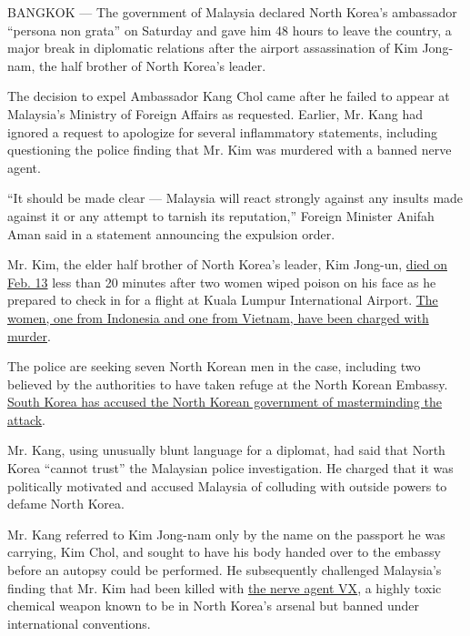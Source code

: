 BANGKOK --- The government of Malaysia declared North Korea's ambassador
``persona non grata'' on Saturday and gave him 48 hours to leave the
country, a major break in diplomatic relations after the airport
assassination of Kim Jong-nam, the half brother of North Korea's leader.

The decision to expel Ambassador Kang Chol came after he failed to
appear at Malaysia's Ministry of Foreign Affairs as requested. Earlier,
Mr. Kang had ignored a request to apologize for several inflammatory
statements, including questioning the police finding that Mr. Kim was
murdered with a banned nerve agent.

``It should be made clear --- Malaysia will react strongly against any
insults made against it or any attempt to tarnish its reputation,''
Foreign Minister Anifah Aman said in a statement announcing the
expulsion order.

Mr. Kim, the elder half brother of North Korea's leader, Kim Jong-un,
\href{https://www.nytimes3xbfgragh.onion/2017/02/14/world/asia/kim-jong-un-brother-killed-malaysia.html}{died
on Feb. 13} less than 20 minutes after two women wiped poison on his
face as he prepared to check in for a flight at Kuala Lumpur
International Airport.
\href{https://www.nytimes3xbfgragh.onion/2017/02/28/world/asia/north-korea-kim-jong-nam-death.html}{The
women, one from Indonesia and one from Vietnam, have been charged with
murder}.

The police are seeking seven North Korean men in the case, including two
believed by the authorities to have taken refuge at the North Korean
Embassy.
\href{https://www.nytimes3xbfgragh.onion/2017/02/20/world/asia/north-korea-assassination-kim-jong-un-brother-malaysia.html}{South
Korea has accused the North Korean government of masterminding the
attack}.

Mr. Kang, using unusually blunt language for a diplomat, had said that
North Korea ``cannot trust'' the Malaysian police investigation. He
charged that it was politically motivated and accused Malaysia of
colluding with outside powers to defame North Korea.

Mr. Kang referred to Kim Jong-nam only by the name on the passport he
was carrying, Kim Chol, and sought to have his body handed over to the
embassy before an autopsy could be performed. He subsequently challenged
Malaysia's finding that Mr. Kim had been killed with
\href{https://www.nytimes3xbfgragh.onion/2017/02/24/world/asia/vx-nerve-agent-kim-jong-nam.html}{the
nerve agent VX}, a highly toxic chemical weapon known to be in North
Korea's arsenal but banned under international conventions.

